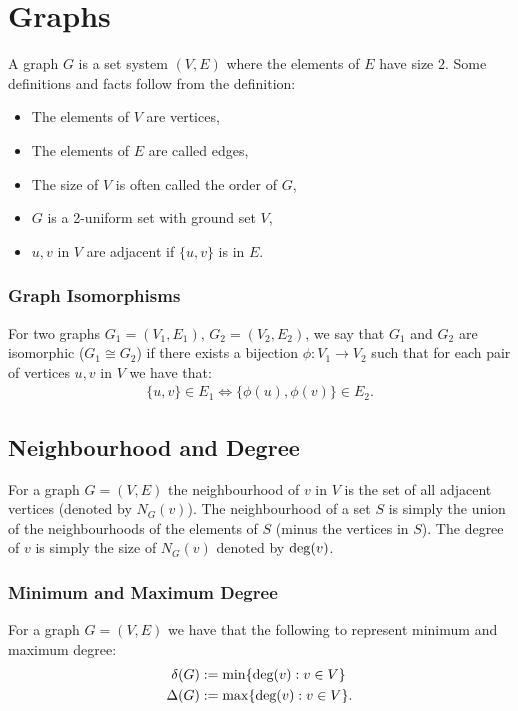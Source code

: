 \section{Graphs}

A graph $G$ is a set system $(V, E)$ where the elements of $E$ have
size $2$. Some definitions and facts follow from the definition:
\begin{itemize}
  \item The elements of $V$ are vertices,
  \item The elements of $E$ are called edges,
  \item The size of $V$ is often called the order of $G$,
  \item $G$ is a 2-uniform set with ground set $V$,
  \item $u, v$ in $V$ are adjacent if $\{u, v\}$ is in $E$.
\end{itemize}  

\subsubsection{Graph Isomorphisms}

For two graphs $G_1 = (V_1, E_1)$, $G_2 = (V_2, E_2)$, we say that
$G_1$ and $G_2$ are isomorphic ($G_1 \cong G_2$) if there exists a
bijection $\phi : V_1 \to V_2$ such that for each pair of vertices
$u, v$ in $V$ we have that: \begin{gather*}
  \{u, v\} \in E_1 \Longleftrightarrow \{\phi(u), \phi(v)\} \in E_2.
\end{gather*}

\subsection{Neighbourhood and Degree}

For a graph $G = (V, E)$ the neighbourhood of $v$ in $V$ 
is the set of all adjacent vertices (denoted by $N_G(v)$). The
neighbourhood of a set $S$ is simply the union of the neighbourhoods
of the elements of $S$ (minus the vertices in $S$).
The degree of $v$ is simply the size of $N_G(v)$ denoted 
by $\operatorname{deg}(v)$.

\subsubsection{Minimum and Maximum Degree}

For a graph $G = (V, E)$ we have that the following to represent
minimum and maximum degree: \begin{align*}
  \delta(G) &:= \operatorname{min}\{\text{deg}(v) : v \in V\} \\
  \Delta(G) &:= \operatorname{max}\{\text{deg}(v) : v \in V\}.
\end{align*}

